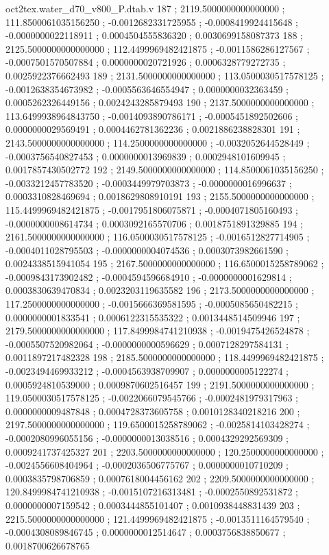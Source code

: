 \begin{filecontents}[overwrite]{oct2tex.water_d70_v800_P.dtab.v}
187 ; 2119.5000000000000000 ; 111.8500061035156250 ; -0.0012682331725955 ; -0.0008419924415648 ; -0.0000000022118911 ; 0.0004504555836320 ; 0.0030699158087373
188 ; 2125.5000000000000000 ; 112.4499969482421875 ; -0.0011586286127567 ; -0.0007501570507884 ; 0.0000000020721926 ; 0.0006328779272735 ; 0.0025922376662493
189 ; 2131.5000000000000000 ; 113.0500030517578125 ; -0.0012638354673982 ; -0.0005563646554947 ; 0.0000000032363459 ; 0.0005262326449156 ; 0.0024243285879493
190 ; 2137.5000000000000000 ; 113.6499938964843750 ; -0.0014093890786171 ; -0.0005451892502606 ; 0.0000000029569491 ; 0.0004462781362236 ; 0.0021886238828301
191 ; 2143.5000000000000000 ; 114.2500000000000000 ; -0.0032052644528449 ; -0.0003756540827453 ; 0.0000000013969839 ; 0.0002948101609945 ; 0.0017857430502772
192 ; 2149.5000000000000000 ; 114.8500061035156250 ; -0.0033212457783520 ; -0.0003449979703873 ; -0.0000000016996637 ; 0.0003310828469694 ; 0.0018629808910191
193 ; 2155.5000000000000000 ; 115.4499969482421875 ; -0.0017951806075871 ; -0.0004071805160493 ; -0.0000000008614734 ; 0.0003092165570706 ; 0.0018751891329885
194 ; 2161.5000000000000000 ; 116.0500030517578125 ; -0.0016512827714905 ; -0.0004011028795503 ; -0.0000000004074536 ; 0.0003073982661590 ; 0.0024338515941054
195 ; 2167.5000000000000000 ; 116.6500015258789062 ; -0.0009843173902482 ; -0.0004594596684910 ; -0.0000000001629814 ; 0.0003830639470834 ; 0.0023203119635582
196 ; 2173.5000000000000000 ; 117.2500000000000000 ; -0.0015666369581595 ; -0.0005085650482215 ; 0.0000000001833541 ; 0.0006122315535322 ; 0.0013448514509946
197 ; 2179.5000000000000000 ; 117.8499984741210938 ; -0.0019475426524878 ; -0.0005507520982064 ; -0.0000000000596629 ; 0.0007128297584131 ; 0.0011897217482328
198 ; 2185.5000000000000000 ; 118.4499969482421875 ; -0.0023494469933212 ; -0.0004563938709907 ; 0.0000000005122274 ; 0.0005924810539000 ; 0.0009870602516457
199 ; 2191.5000000000000000 ; 119.0500030517578125 ; -0.0022066079545766 ; -0.0002481979317963 ; 0.0000000009487848 ; 0.0004728373605758 ; 0.0010128340218216
200 ; 2197.5000000000000000 ; 119.6500015258789062 ; -0.0025814103428274 ; -0.0002080996055156 ; -0.0000000013038516 ; 0.0004329292569309 ; 0.0009241737425327
201 ; 2203.5000000000000000 ; 120.2500000000000000 ; -0.0024556608404964 ; -0.0002036506775767 ; 0.0000000010710209 ; 0.0003835798706859 ; 0.0007618004456162
202 ; 2209.5000000000000000 ; 120.8499984741210938 ; -0.0015107216313481 ; -0.0002550892531872 ; 0.0000000007159542 ; 0.0003444855101407 ; 0.0010938448831439
203 ; 2215.5000000000000000 ; 121.4499969482421875 ; -0.0013511164579540 ; -0.0004308089846745 ; 0.0000000012514647 ; 0.0003756838850677 ; 0.0018700626678765

\end{filecontents}
